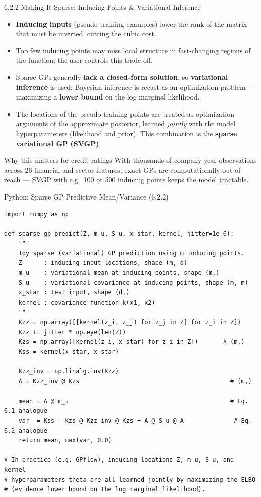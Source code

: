 \documentclass[aspectratio=169,10pt]{beamer}
\begin{document}
\begin{frame}{6.2.2 Making It Sparse: Inducing Points \& Variational Inference}
  \begin{itemize}
    \item \textbf{Inducing inputs} (pseudo-training examples) lower the rank
          of the matrix that must be inverted, cutting the cubic cost.
    \item Too few inducing points may miss local structure in fast-changing
          regions of the function; the user controls this trade-off.
    \item Sparse GPs generally \textbf{lack a closed-form solution}, so
          \textbf{variational inference} is used: Bayesian inference is
          recast as an optimization problem --- maximizing a \textbf{lower
          bound} on the log marginal likelihood.
    \item The locations of the pseudo-training points are treated as
          optimization arguments of the approximate posterior, learned
          \emph{jointly} with the model hyperparameters (likelihood and
          prior). This combination is the \textbf{sparse variational GP
          (SVGP)}.
  \end{itemize}
  \vspace{0.3em}
  \begin{alertblock}{Why this matters for credit ratings}
    With thousands of company-year observations across 26 financial and
    sector features, exact GPs are computationally out of reach --- SVGP
    with e.g.\ 100 or 500 inducing points keeps the model tractable.
  \end{alertblock}
\end{frame}

\begin{frame}[fragile]{Python: Sparse GP Predictive Mean/Variance (6.2.2)}
\begin{lstlisting}
import numpy as np

def sparse_gp_predict(Z, m_u, S_u, x_star, kernel, jitter=1e-6):
    """
    Toy sparse (variational) GP prediction using m inducing points.
    Z      : inducing input locations, shape (m, d)
    m_u    : variational mean at inducing points, shape (m,)
    S_u    : variational covariance at inducing points, shape (m, m)
    x_star : test input, shape (d,)
    kernel : covariance function k(x1, x2)
    """
    Kzz = np.array([[kernel(z_i, z_j) for z_j in Z] for z_i in Z])
    Kzz += jitter * np.eye(len(Z))
    Kzs = np.array([kernel(z_i, x_star) for z_i in Z])       # (m,)
    Kss = kernel(x_star, x_star)

    Kzz_inv = np.linalg.inv(Kzz)
    A = Kzz_inv @ Kzs                                          # (m,)

    mean = A @ m_u                                             # Eq. 6.1 analogue
    var  = Kss - Kzs @ Kzz_inv @ Kzs + A @ S_u @ A              # Eq. 6.2 analogue
    return mean, max(var, 0.0)

# In practice (e.g. GPflow), inducing locations Z, m_u, S_u, and kernel
# hyperparameters theta are all learned jointly by maximizing the ELBO
# (evidence lower bound on the log marginal likelihood).
\end{lstlisting}
\end{frame}
\end{document}
